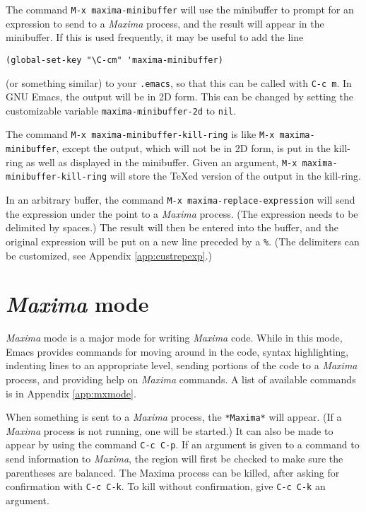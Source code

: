 \documentclass{article}
\newcommand{\mx}{\textsl{\sffamily Maxima}}
\begin{document}
The command \texttt{M-x maxima-minibuffer} will use the minibuffer to
prompt for an expression to send to a \mx{} process, and the result
will appear in the minibuffer.  If this is used frequently, it may be
useful to add the line
\begin{verbatim}
(global-set-key "\C-cm" 'maxima-minibuffer)
\end{verbatim}
(or something similar) to your \texttt{.emacs}, so that this can be
called with \texttt{C-c m}. 
In GNU Emacs, the output will be in 2D form.  This can be changed by
setting the customizable variable \texttt{maxima-minibuffer-2d} to
\texttt{nil}. 

The command \texttt{M-x maxima-minibuffer-kill-ring} is like
\texttt{M-x maxima-minibuffer}, except the output, which will not be
in 2D form, is put in the kill-ring as well as displayed in the
minibuffer.  Given an argument, \texttt{M-x
  maxima-minibuffer-kill-ring} will store the \TeX{}ed version of the
output in the kill-ring.

In an arbitrary buffer, the command \texttt{M-x
  maxima-replace-expression} will send the expression under the point
to a \mx{} process.  (The expression needs to be delimited by spaces.)
The result will then be entered into the buffer, and the original
expression will be put on a new line preceded by a \verb+%+.  
(The delimiters can be 
customized, see Appendix \ref{app:custrepexp}.)

\section{\mx{} mode}

\mx{} mode is a major mode for writing \mx{} code.  While in this
mode, Emacs provides commands for moving around in the code, syntax
highlighting, indenting lines to an appropriate level, sending
portions of the code to a \mx{} process, and providing help on \mx{}
commands.  A list of available commands is in Appendix
\ref{app:mxmode}.

When something is sent to a \mx{} process, the \texttt{*Maxima*} will
appear.  (If a \mx{} process is not running, one will be started.)  It
can also be made to appear by using the command \texttt{C-c C-p}.  If
an argument is given to a command to send information to \mx{}, the
region will first be checked to make sure the parentheses are
balanced.  The Maxima process can be killed, after asking for
confirmation with \texttt{C-c C-k}.  To kill without confirmation, give
\texttt{C-c C-k} an argument.
\end{document}
